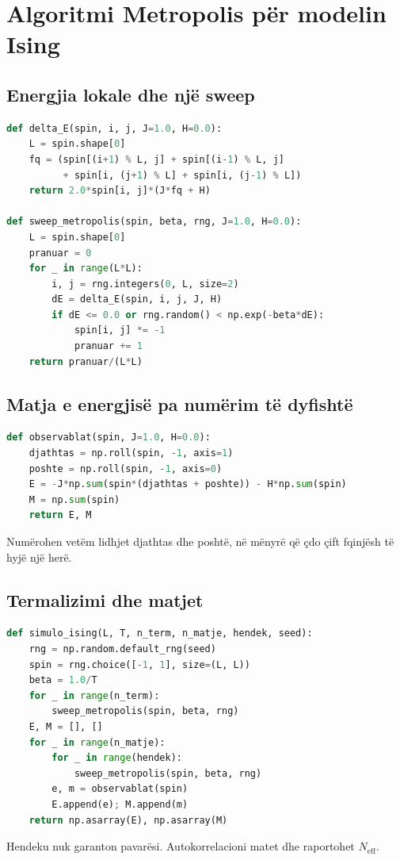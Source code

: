 \documentclass[11pt,oneside,openany]{book}
\begin{document}
\section{Algoritmi Metropolis për modelin Ising}
\subsection{Energjia lokale dhe një sweep}
\begin{lstlisting}[language=Python,caption={Përditësimi Metropolis me një spin.}]
def delta_E(spin, i, j, J=1.0, H=0.0):
    L = spin.shape[0]
    fq = (spin[(i+1) % L, j] + spin[(i-1) % L, j]
          + spin[i, (j+1) % L] + spin[i, (j-1) % L])
    return 2.0*spin[i, j]*(J*fq + H)

def sweep_metropolis(spin, beta, rng, J=1.0, H=0.0):
    L = spin.shape[0]
    pranuar = 0
    for _ in range(L*L):
        i, j = rng.integers(0, L, size=2)
        dE = delta_E(spin, i, j, J, H)
        if dE <= 0.0 or rng.random() < np.exp(-beta*dE):
            spin[i, j] *= -1
            pranuar += 1
    return pranuar/(L*L)
\end{lstlisting}

\subsection{Matja e energjisë pa numërim të dyfishtë}
\begin{lstlisting}[language=Python]
def observablat(spin, J=1.0, H=0.0):
    djathtas = np.roll(spin, -1, axis=1)
    poshte = np.roll(spin, -1, axis=0)
    E = -J*np.sum(spin*(djathtas + poshte)) - H*np.sum(spin)
    M = np.sum(spin)
    return E, M
\end{lstlisting}
Numërohen vetëm lidhjet djathtas dhe poshtë, në mënyrë që çdo çift fqinjësh të hyjë një herë.

\subsection{Termalizimi dhe matjet}
\begin{lstlisting}[language=Python,caption={Struktura e një simulimi të plotë.}]
def simulo_ising(L, T, n_term, n_matje, hendek, seed):
    rng = np.random.default_rng(seed)
    spin = rng.choice([-1, 1], size=(L, L))
    beta = 1.0/T
    for _ in range(n_term):
        sweep_metropolis(spin, beta, rng)
    E, M = [], []
    for _ in range(n_matje):
        for _ in range(hendek):
            sweep_metropolis(spin, beta, rng)
        e, m = observablat(spin)
        E.append(e); M.append(m)
    return np.asarray(E), np.asarray(M)
\end{lstlisting}
Hendeku nuk garanton pavarësi. Autokorrelacioni matet dhe raportohet $N_{\mathrm{eff}}$.
\end{document}
